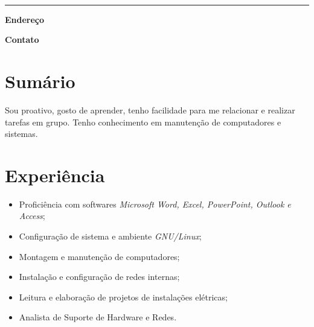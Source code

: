 \documentclass{article}
\newcommand{\hr}{%
    \noindent\parbox{\linewidth}{\rule[5pt]{\textwidth}{1pt}}%
}
\renewcommand{\maketitle}{
    \noindent
    {\Huge\bfseries\theauthor} \\
    \hr%
}
\begin{document}
\author{Lucas Barbosa de Sousa}

\maketitle
\begin{multicols}{2}
    \noindent%
    \begin{flushleft}
        \noindent%
        \textbf{Endereço} \\
        \color{sec}{
            Rua dos Saburus, 58B \\
            Santa Amélia \\
            São Paulo, SP \\
            22 anos
        }
    \end{flushleft}
    \columnbreak
    \begin{flushright}
        \noindent
        \textbf{Contato} \\
        \color{sec}{
            +55 88 9378--8298 \\
            lbdsask@gmail.com
        }
    \end{flushright}
\end{multicols}

\section{Sum\'ario}

Sou proativo, gosto de aprender, tenho facilidade para me relacionar e realizar
tarefas em grupo. Tenho conhecimento em manutenção de computadores e sistemas.

\section{Experi\^{e}ncia}

\begin{itemize}
    \item Proficiência com softwares \textit{Microsoft Word, Excel, PowerPoint,
        Outlook e Access};
    \item Configuração de sistema e ambiente \textit{GNU/Linux};
    \item Montagem e manutenção de computadores;
    \item Instalação e configuração de redes internas;
    \item Leitura e elaboração de projetos de instalações elétricas;
    \item Analista de Suporte de Hardware e Redes.
\end{itemize}
\end{document}
